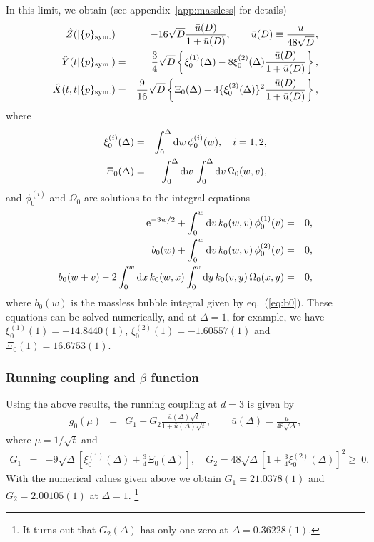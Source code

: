 \documentclass[preprint]{ptephy_v1}%
\newcommand{\rme}{{\rm e}}
\newcommand{\rmd}{{\rm d}}
\begin{document}
In this limit, we obtain (see appendix~\ref{app:massless} for details)
\begin{eqnarray}
\hat  Z(\vert  \{ p \}_{\rm sym.}) &=& -16\sqrt{D}\frac{\bar u(D) }{1 + \bar u (D)}, \qquad \bar u(D) \equiv \frac{u}{48\sqrt{D}}, \label{eq:hatZ}\\
\hat Y(t\vert \{ p \}_{\rm sym.}) &=& \frac{3 }{4}\sqrt{D}  \left\{\xi_0^{(1)}(\Delta) - 8\xi_0^{(2)}(\Delta)
\frac{\bar u(D)}{1+\bar u(D)}\right\}, \label{eq:hatY}\\
\hat X(t,t\vert  \{ p \}_{\rm sym.}) &=& \frac{9}{16}\sqrt{D}\left\{ \Xi_0(\Delta) -4\{\xi_0^{(2)}(\Delta)\}^2\frac{\bar u(D)}{1+\bar u(D)}\right\}, \label{eq:hatX}
\end{eqnarray}
where 
\begin{eqnarray}
\xi_0^{(i)}(\Delta) &=& \int_0^\Delta  \rmd w\, \phi_0^{(i)}(w), \quad i=1,2, \\
\Xi_0(\Delta) &=&\int_0^\Delta  \rmd w\, \int_0^\Delta  \rmd v\, \Omega_0(w,v) ,
\end{eqnarray}
and $\phi_0^{(i)}$ and $\Omega_0$ are solutions to the integral equations
\begin{eqnarray}
\rme^{-3w/2} + \int_0^w  \rmd v\, k_0(w,v)\, \phi_0^{(1)}(v) &=& 0,  \label{eq:phi0_1}\\
b_0(w) +\int_0^w  \rmd v\, k_0(w,v)\, \phi_0^{(2)}(v) &=& 0 , \label{eq:phi0_2}\\
b_0(w+v) -2 \int_0^w  \rmd x\, k_0(w,x) \int_0^v  \rmd y\, k_0(v,y)\, \Omega_0 (x,y) &=& 0,
\label{eq:Omega0}
\end{eqnarray}
 where $b_0(w)$ is the massless bubble integral given by eq.~(\ref{eq:b0}). 
These equations can be solved numerically, and 
at $\Delta =1$, for example, we have  $\xi_0^{(1)}(1) = -14.8440(1)$,  $\xi_0^{(2)}(1) =  -1.60557(1)$ and
$\Xi_0(1) =  16.6753(1)$.

\subsubsection{Running coupling and $\beta$ function}
Using the above results, the running coupling at $d=3$ is given by
\begin{eqnarray}
g_0(\mu) &=& G_1 + G_2 \frac{\bar u(\Delta) \sqrt{t}}{1+ \bar u(\Delta) \sqrt{t}}, \qquad \bar u(\Delta)= \frac{ u}{48\sqrt{\Delta}} ,
\end{eqnarray}
where $\mu =1/\sqrt{t}$ and
\begin{eqnarray}
G_1&=& -9\sqrt{\Delta} \left[ \xi_0^{(1)}(\Delta) +\frac{3}{4}\Xi_0(\Delta) \right], \quad
G_2 = 48\sqrt{\Delta} \left[ 1 +\frac{3}{4}\xi_0^{(2)}(\Delta)\right]^2  \ge\ 0 . 
\end{eqnarray}
 With the numerical values given above we obtain $G_1 = 21.0378(1)$ and $G_2 = 2.00105(1)$ at $\Delta=1$.
\footnote{It turns out that $G_2(\Delta)$ has only one zero at
  $\Delta=0.36228(1)$.}
\end{document}
